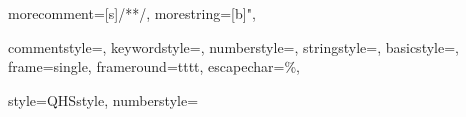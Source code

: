 \usepackage[ngerman]{babel}

\usepackage{fontspec}

\renewcommand{\familydefault}{\sfdefault}

\usepackage{graphicx}

\usepackage{setspace}

\usepackage{csquotes}

\usepackage{scrlayer-scrpage}


%

\usepackage{lipsum}

\usepackage{listings}
\renewcommand{\lstlistingname}{Auflistung}
\renewcommand{\lstlistlistingname}{Auflistungsverzeichnis}
\usepackage{xcolor}
\newcommand*{\listingFont}{\ttfamily}
{
    morecomment=[s]{/*}{*/}, %
    morestring=[b]", %
}

{
    commentstyle=\color{codegreen},
    keywordstyle=\color{codeviolet},
    numberstyle=\tiny\color{codegray},
    stringstyle=\color{codebrown},
    basicstyle=\listingFont\footnotesize,
    frame=single,
    frameround=tttt,
    escapechar=\%,
}

\lstset
{
    style=QHSstyle,
    numberstyle=\listingFont
}

\usepackage{float}

\usepackage{tabularx}

\usepackage{pgfplots}


